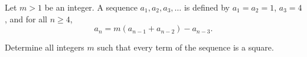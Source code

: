 Let $m > 1$ be an integer.  A sequence $a_1, a_2, a_3, \ldots$ is defined by $a_1 = a_2 = 1$,  $a_3 = 4$,  and for all $n \ge 4$,  $$a_n = m(a_{n - 1} + a_{n - 2}) - a_{n - 3}.$$

Determine all integers $m$ such that every term of the sequence is a square.
